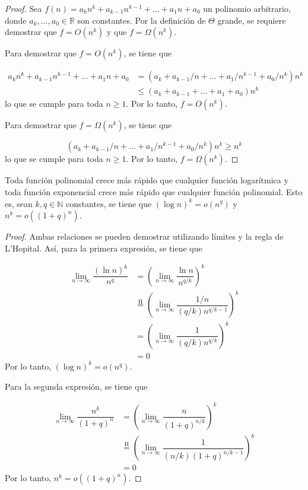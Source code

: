 \begin{proof}
    Sea $f(n)=a_{k}n^{k}+a_{k-1}n^{k-1}+\dots+a_{1}n+a_{0}$ un polinomio
    arbitrario, donde $a_k,\dots,a_{0}\in\mathbb{R}$ son constantes.
    Por la definición de $\Theta$ grande, se requiere demostrar que $f=O(n^{k})$
    y que $f=\Omega(n^{k})$. 
    
    Para demostrar que $f=O(n^{k})$, se tiene que 
    
    \begin{align*}
        a_{k}n^{k}+a_{k-1}n^{k-1}+\dots+a_{1}n+a_{0} &= (a_{k}+a_{k-1}/n+\dots+a_{1}/n^{k-1}+a_{0}/n^{k})n^{k}\\
        &\leq(a_{k}+a_{k-1}+\dots+a_{1}+a_{0})n^{k}
    \end{align*}
    lo que se cumple para toda $n\geq1$. Por lo tanto, $f=O(n^{k})$.
    
    Para demostrar que $f=\Omega(n^{k})$, se tiene que 
    
    \[
        (a_{k}+a_{k-1}/n+\dots+a_{1}/n^{k-1}+a_{0}/n^{k})n^{k}\geq n^{k}
    \]
    lo que se cumple para toda $n\geq1$. Por lo tanto, $f=\Omega(n^{k})$.
\end{proof}

\begin{thm}
    Toda función polinomial crece más rápido que cualquier función logarítmica y
    toda función exponencial crece más rápido que cualquier función polinomial.
    Esto es, sean $k,q\in\mathbb{N}$ constantes, se tiene que $(\log n)^k=o(n^q)$
    y $n^k=o((1+q)^n)$.
\end{thm}

\begin{proof}
    Ambas relaciones se pueden demostrar utilizando límites y la regla
    de L'Hopital. Así, para la primera expresión, se tiene que
    
    \begin{align*}
        \lim_{n\to\infty}\dfrac{(\ln n)^{k}}{n^{q}} &= \left(\lim_{n\to\infty}\dfrac{\ln n}{n^{q/k}}\right)^{k}\\
        &\overset{\text{H}}{=}\left(\lim_{n\to\infty}\dfrac{1/n}{(q/k)n^{q/k-1}}\right)^{k}\\
        &= \left(\lim_{n\to\infty}\dfrac{1}{(q/k)n^{q/k}}\right)^{k}\\
        &= 0
    \end{align*}
    Por lo tanto, $(\log n)^{k}=o(n^{q})$.
    
    Para la segunda expresión, se tiene que 
    
    \begin{align*}
    \lim_{n\to\infty}\dfrac{n^{k}}{(1+q)^{n}} &= \left(\lim_{n\to\infty}\dfrac{n}{(1+q)^{n/k}}\right)^{k}\\
    &\overset{\text{H}}{=}\left(\lim_{n\to\infty}\dfrac{1}{(n/k)(1+q)^{n/k-1}}\right)^{k}\\
    &= 0
    \end{align*}
    Por lo tanto, $n^{k}=o((1+q)^{n})$.
\end{proof}

